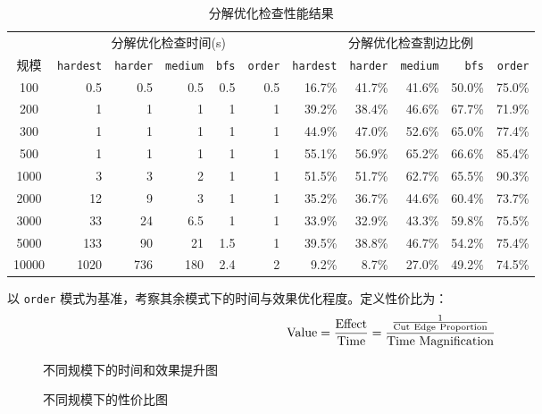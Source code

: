\documentclass[a4paper,12pt]{article}
\begin{document}
\begin{CJK}{UTF8}{song}
\begin{table}[H]
    \centering
    \caption{分解优化检查性能结果}
    \begin{tabular}{c|rrrrr|rrrrr}{}
    &\multicolumn{5}{c}{分解优化检查时间(s)} & \multicolumn{5}{c}{分解优化检查割边比例} \\
    规模 & \texttt{hardest} & \texttt{harder} & \texttt{medium} & \texttt{bfs} & \texttt{order} & \texttt{hardest} & \texttt{harder} & \texttt{medium} & \texttt{bfs} & \texttt{order} \\
    \hline
    100 & 0.5 &0.5 &0.5	&0.5	&0.5 & 16.7\% & 41.7\% & 41.6\% & 50.0\% & 75.0\% \\
    200 & 1	&1	&1	&1	&1 & 39.2\% & 38.4\% & 46.6\% & 67.7\% & 71.9\% \\
    300 & 1 &1	&1	&1	&1 & 44.9\% & 47.0\% & 52.6\% & 65.0\% & 77.4\% \\
    500 &1	&1	&1	&1	&1  & 55.1\% & 56.9\% & 65.2\% & 66.6\% & 85.4\% \\
    1000 &3	&3	&2	&1	&1 & 51.5\% & 51.7\% & 62.7\% & 65.5\% & 90.3\% \\
    2000 &12	&9	&3	&1	&1 & 35.2\% & 36.7\% & 44.6\% & 60.4\% & 73.7\% \\
    3000 &33	&24	&6.5	&1	&1 & 33.9\% & 32.9\% & 43.3\% & 59.8\% & 75.5\% \\
    5000 &133	&90	&21	&1.5	&1 & 39.5\% & 38.8\% & 46.7\% & 54.2\% & 75.4\% \\
    10000 &1020	&736	&180	&2.4	&2 & 9.2\% & 8.7\% & 27.0\% & 49.2\% & 74.5\% \\
    \hline
    \end{tabular}
\end{table}

以 \texttt{order} 模式为基准，考察其余模式下的时间与效果优化程度。定义性价比为：
\begin{equation}
    \text{Value} = \frac{\rm Effect}{\rm Time} = \frac{\frac{1}{\rm Cut~Edge~Proportion}}{\rm Time~Magnification}
\end{equation}

\begin{figure}[H]
    \centering
    
    
    \caption{不同规模下的时间和效果提升图}
\end{figure}

\begin{figure}[H]
    \centering
    
    \caption{不同规模下的性价比图}
\end{figure}


\end{CJK}
\end{document}
